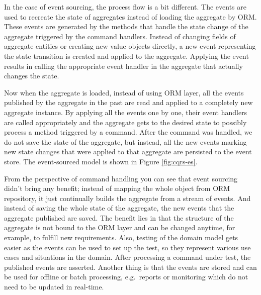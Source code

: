 \documentclass{book}
\begin{document}
In the case of event sourcing, the process flow is a bit different. The
events are used to recreate the state of aggregates instead of loading
the aggregate by ORM. These events are generated by the methods that
handle the state change of the aggregate triggered by the command
handlers. Instead of changing fields of aggregate entities or creating
new value objects directly, a new event representing the state
transition is created and applied to the aggregate. Applying the event
results in calling the appropriate event handler in the aggregate that
actually changes the state.

Now when the aggregate is loaded, instead of using ORM layer, all the
events published by the aggregate in the past are read and applied to a
completely new aggregate instance. By applying all the events one by
one, their event handlers are called appropriately and the aggregate
gets to the desired state to possibly process a method triggered by a
command. After the command was handled, we do not save the state of the
aggregate, but instead, all the new events marking new state changes
that were applied to that aggregate are persisted to the event store.
The event-sourced model is shown in Figure \ref{fig:cqrs-es}.

From the perspective of command handling you can see that event sourcing
didn't bring any benefit; instead of mapping the whole object from ORM
repository, it just continually builds the aggregate from a stream of
events. And instead of saving the whole state of the aggregate, the new
events that the aggregate published are saved. The benefit lies in that
the structure of the aggregate is not bound to the ORM layer and can be
changed anytime, for example, to fulfill new requirements. Also, testing
of the domain model gets easier as the events can be used to set up the
test, so they represent various use cases and situations in the domain.
After processing a command under test, the published events are
asserted. Another thing is that the events are stored and can be used
for offline or batch processing, e.g.~reports or monitoring which do not
need to be updated in real-time.
\end{document}
